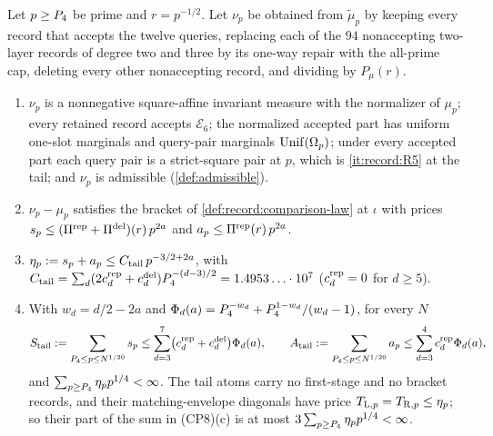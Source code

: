 \begin{lemma}\label{lem:tail-prices}
Let $p\ge P_4$ be prime and $r=p^{-1/2}$. Let $\nu_p$ be obtained from
$\widetilde\mu_p$ by keeping every record that accepts the twelve queries,
replacing each of the $94$ nonaccepting two-layer records of degree two
and three by its one-way repair with the all-prime cap, deleting every other
nonaccepting record, and dividing by $P_\mu(r)$.
\begin{enumerate}[label=(\roman*)]
\item $\nu_p$ is a nonnegative square-affine invariant measure with the
 normalizer of $\mu_p$; every retained record accepts $\mathcal E_6$; the
 normalized accepted part has uniform one-slot marginals and query-pair
 marginals $\operatorname{Unif}(\Omega_{p})$; under every accepted part each query pair is a
 strict-square pair at $p$, which is \ref{it:record:R5} at the tail; and
 $\nu_p$ is admissible (\cref{def:admissible}).
\item $\nu_p-\mu_p$ satisfies the bracket of \cref{def:record:comparison-law}
 at $\iota$ with prices $s_p\le(\Pi^{\rm rep}+\Pi^{\rm del})(r)\,p^{2a}$ and
 $a_p\le\Pi^{\rm rep}(r)\,p^{2a}$.
\item $\eta_p:=s_p+a_p\le C_{\rm tail}\,p^{-3/2+2a}$, with
 $C_{\rm tail}=\sum_d(2c^{\rm rep}_d+c^{\rm del}_d)P_4^{-(d-3)/2}
 =1.4953\ldots\cdot10^7$ ($c^{\rm rep}_d=0$ for $d\ge5$).
\item With $w_d=d/2-2a$ and $\Phi_d(a)=P_4^{-w_d}+P_4^{1-w_d}/(w_d-1)$,
 for every $N$
 \[
  S_{\rm tail}:=\sum_{P_4\le p\le N^{1/20}}s_p\le
  \sum_{d=3}^7\bigl(c^{\rm rep}_d+c^{\rm del}_d\bigr)\Phi_d(a),\qquad
  A_{\rm tail}:=\sum_{P_4\le p\le N^{1/20}}a_p\le
  \sum_{d=3}^4c^{\rm rep}_d\Phi_d(a),
 \]
 and $\sum_{p\ge P_4}\eta_pp^{1/4}<\infty$. The tail atoms carry no
 first-stage and no bracket records, and their matching-envelope diagonals
 have price $T_{{\rm L},p}=T_{{\rm R},p}\le\eta_p$; so their part of the sum
 in (CP8)(c) is at most $3\sum_{p\ge P_4}\eta_pp^{1/4}<\infty$.
\end{enumerate}
\end{lemma}

